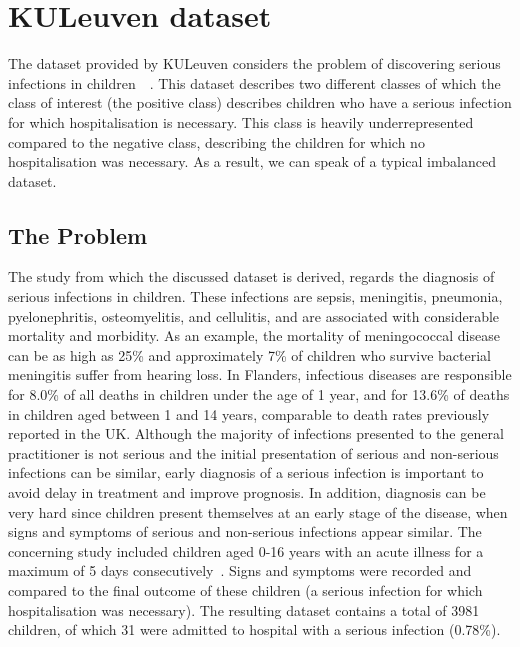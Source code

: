 \section{KULeuven dataset}\label{ill-ds}
The dataset provided by KULeuven considers the problem of discovering serious infections in children~\cite{buntinx}~\cite{symptoms}. This dataset describes two different classes of which the class of interest (the positive class) describes children who have a serious infection for which hospitalisation is necessary. This class is heavily underrepresented compared to the negative class, describing the children for which no hospitalisation was necessary. As a result, we can speak of a typical imbalanced dataset. 

\subsection{The Problem}\label{ill-problem}
The study from which the discussed dataset is derived, regards the diagnosis of serious infections in children. These infections are sepsis, meningitis, pneumonia, pyelonephritis, osteomyelitis, and cellulitis, and are associated with considerable mortality and morbidity. As an example, the mortality of meningococcal disease can be as high as 25\% and approximately 7\% of children who survive bacterial meningitis suffer from hearing loss.  In Flanders, infectious diseases are responsible for 8.0\% of all deaths in children under the age of 1 year, and for 13.6\% of deaths in children aged between 1 and 14 years, comparable to death rates previously reported in the UK.  Although the majority of infections presented to the general practitioner is not serious and the initial presentation of serious and non-serious infections can be similar, early diagnosis of a serious infection is important to avoid delay in treatment and improve prognosis. In addition, diagnosis can be very hard since children present themselves at an early stage of the disease, when signs and symptoms of serious and non-serious infections appear similar. The concerning study included children aged 0-16 years with an acute illness for a maximum of 5 days consecutively~\cite{symptoms}. Signs and symptoms were recorded and compared to the final outcome of these children (a serious infection for which hospitalisation was necessary). The resulting dataset contains a total of 3981 children, of which 31 were admitted to hospital with a serious infection (0.78\%). 


